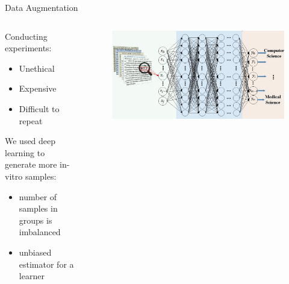 \documentclass{beamer}
\begin{document}
\begin{frame}{Data Augmentation}
	\begin{columns}
		\begin{column}{.48\textwidth}
			Conducting experiments:
			\begin{itemize}
				\item Unethical
				\item Expensive
				\item Difficult to repeat
			\end{itemize}
			\vspace{1cm}
			We used deep learning to generate more in-vitro samples:
			\begin{itemize}
				\item number of samples in groups is imbalanced
				\item unbiased estimator for a learner
			\end{itemize}
		\end{column}
		\begin{column}{.48\textwidth}
			\begin{figure}[ht]
				\centering
				\includegraphics[width=1\textwidth,height=0.7\textheight]{figures/deep-learning-image.jpg}
				\caption*{\label{fig:deep-learning}}
			\end{figure}
		\end{column}
	\end{columns}
\end{frame}
\end{document}
